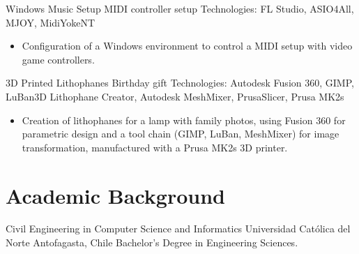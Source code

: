 \documentclass[12pt,letterpaper,sans]{moderncv}
\begin{document}
\cventry{}
{Windows Music Setup}
{MIDI controller setup}
{\newline Technologies: FL Studio, ASIO4All, MJOY, MidiYokeNT}
{\newline}
{
  \begin{itemize}
    \item Configuration of a Windows environment to control a MIDI setup with video game controllers.
  \end{itemize}
}
\vspace{0.5em}

\cventry{}
{3D Printed Lithophanes}
{Birthday gift}
{\newline Technologies: Autodesk Fusion 360, GIMP, LuBan3D Lithophane Creator, Autodesk MeshMixer, PrusaSlicer, Prusa MK2s}
{\newline}
{
  \begin{itemize}
    \item Creation of lithophanes for a lamp with family photos, using Fusion 360 for parametric design and a tool chain (GIMP, LuBan, MeshMixer) for image transformation, manufactured with a Prusa MK2s 3D printer.
  \end{itemize}
}
\vspace{0.5em}

\newpage

\section{Academic Background}
{Civil Engineering in Computer Science and Informatics}
{Universidad Católica del Norte}
{\newline Antofagasta, Chile}
{\newline Bachelor’s Degree in Engineering Sciences.}
{}
\end{document}
